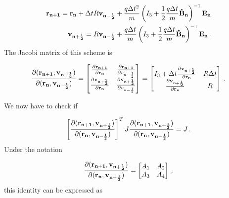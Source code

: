 \documentclass[12pt, class=report, crop=false]{standalone}
\begin{document}
\begin{subequations}
  \begin{align}
    \vb{r_{n+1}} = \vb{r_n} + \Delta t R \vb{v_{n-\frac{1}{2}}} + \frac{q\Delta t^2}{m} \left( I_3 + \frac{1}{2}\frac{q\Delta t}{m} \vb{\hat{B}_n} \right)^{-1} \vb{E_n}\\
    \vb{v_{n+\frac{1}{2}}} = R \vb{v_{n-\frac{1}{2}}} + \frac{q\Delta t}{m} \left( I_3 + \frac{1}{2}\frac{q\Delta t}{m} \vb{\hat{B}_n} \right)^{-1} \vb{E_n}\,.
  \end{align}
\end{subequations}
The Jacobi matrix of this scheme is

\begin{equation}
\label{eq:jacobian}
  \pdv{(\vb{r_{n+1}}, \vb{v_{n+\frac{1}{2}}})}{(\vb{r_n}, \vb{v_{n-\frac{1}{2}}})} =
  \begin{bmatrix}
    \pdv{\vb{r_{n+1}}}{\vb{r_n}} & \pdv{\vb{r_{n+1}}}{v_{n-\frac{1}{2}}}\\
    \pdv{\vb{v_{n+\frac{1}{2}}}}{\vb{r_n}} & \pdv{\vb{v_{n+\frac{1}{2}}}}{v_{n-\frac{1}{2}}}
  \end{bmatrix} =
  \begin{bmatrix}
    I_3 + \Delta t \pdv{\vb{v_{n+\frac{1}{2}}}}{\vb{r_n}} & R \Delta t\\
    \pdv{\vb{v_{n+\frac{1}{2}}}}{\vb{r_n}} & R
  \end{bmatrix}\,.
\end{equation}

We now have to check if

\begin{equation}
  \left[\pdv{(\vb{r_{n+1}}, \vb{v_{n+\frac{1}{2}}})}{(\vb{r_n}, \vb{v_{n-\frac{1}{2}}})}\right]^T J \pdv{(\vb{r_{n+1}}, \vb{v_{n+\frac{1}{2}}})}{(\vb{r_n}, \vb{v_{n-\frac{1}{2}}})} = J\,.
\end{equation}
Under the notation

\begin{equation}
  \pdv{(\vb{r_{n+1}}, \vb{v_{n+\frac{1}{2}}})}{(\vb{r_n}, \vb{v_{n-\frac{1}{2}}})} =
  \begin{bmatrix}
    A_1 & A_2\\
    A_3 & A_4
  \end{bmatrix}\,,
\end{equation}
this identity can be expressed as
\end{document}
